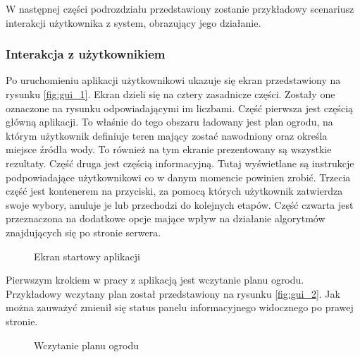 \documentclass[twoside]{iisthesis}
\begin{document}
W następnej części podrozdziału przedstawiony zostanie przykładowy scenariusz interakcji użytkownika z system, obrazujący jego działanie.

\subsubsection{Interakcja z użytkownikiem}
Po uruchomieniu aplikacji użytkownikowi ukazuje się ekran przedstawiony na rysunku \eqref{fig:gui_1}. Ekran dzieli się na cztery zasadnicze części. Zostały one oznaczone na rysunku odpowiadającymi im liczbami. Część pierwsza jest częścią główną aplikacji. To właśnie do tego obszaru ładowany jest plan ogrodu, na którym użytkownik definiuje teren mający zostać nawodniony oraz określa miejsce źródła wody. To również na tym ekranie prezentowany są wszystkie rezultaty. Część druga jest częścią informacyjną. Tutaj wyświetlane są instrukcje podpowiadające użytkownikowi co w danym momencie powinien zrobić. Trzecia część jest kontenerem na przyciski, za pomocą których użytkownik zatwierdza swoje wybory, anuluje je lub przechodzi do kolejnych etapów. Część czwarta jest przeznaczona na dodatkowe opcje mające wpływ na działanie algorytmów znajdujących się po stronie serwera.
\begin{figure}[!htb]
	\centering
	\caption{Ekran startowy aplikacji}
	\label{fig:gui_1}
\end{figure}

Pierwszym krokiem w pracy z aplikacją jest wczytanie planu ogrodu. Przykładowy wczytany plan został przedstawiony na rysunku \eqref{fig:gui_2}. Jak można zauważyć zmienił się status panelu informacyjnego widocznego po prawej stronie.
\begin{figure}[!htb]
	\centering
	\caption{Wczytanie planu ogrodu}
	\label{fig:gui_2}
\end{figure}
\end{document}
